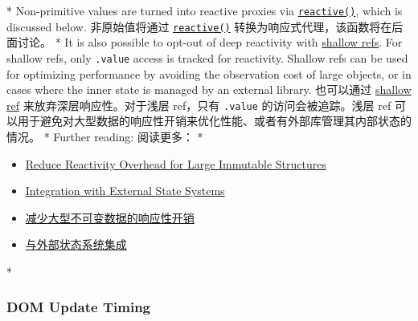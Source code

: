 \begin{paracol}{2}
\switchcolumn[0]*%
Non-primitive values are turned into reactive proxies via
\href{https://vuejs.org/guide/essentials/reactivity-fundamentals.html\#reactive}{\texttt{reactive()}},
which is discussed below.
\switchcolumn
非原始值将通过
\href{https://cn.vuejs.org/guide/essentials/reactivity-fundamentals.html\#reactive}{\texttt{reactive()}}
转换为响应式代理，该函数将在后面讨论。
\switchcolumn[0]*%
It is also possible to opt-out of deep reactivity with
\href{https://vuejs.org/api/reactivity-advanced.html\#shallowref}{shallow
refs}. For shallow refs, only \texttt{.value} access is tracked for
reactivity. Shallow refs can be used for optimizing performance by
avoiding the observation cost of large objects, or in cases where the
inner state is managed by an external library.
\switchcolumn
也可以通过
\href{https://cn.vuejs.org/api/reactivity-advanced.html\#shallowref}{shallow
ref} 来放弃深层响应性。对于浅层 ref，只有 \texttt{.value}
的访问会被追踪。浅层 ref
可以用于避免对大型数据的响应性开销来优化性能、或者有外部库管理其内部状态的情况。
\switchcolumn[0]*%
Further reading:
\switchcolumn
阅读更多：
\switchcolumn[0]*%
\begin{itemize}
\item
  \href{https://vuejs.org/guide/best-practices/performance.html\#reduce-reactivity-overhead-for-large-immutable-structures}{Reduce
  Reactivity Overhead for Large Immutable Structures}
\item
  \href{https://vuejs.org/guide/extras/reactivity-in-depth.html\#integration-with-external-state-systems}{Integration
  with External State Systems}
\end{itemize}
\switchcolumn
\begin{itemize}
\item
  \href{https://cn.vuejs.org/guide/best-practices/performance.html\#reduce-reactivity-overhead-for-large-immutable-structures}{减少大型不可变数据的响应性开销}
\item
  \href{https://cn.vuejs.org/guide/extras/reactivity-in-depth.html\#integration-with-external-state-systems}{与外部状态系统集成}
\end{itemize}
\switchcolumn[0]*%
\subsubsection{DOM Update Timing}
\switchcolumn

\end{paracol}
